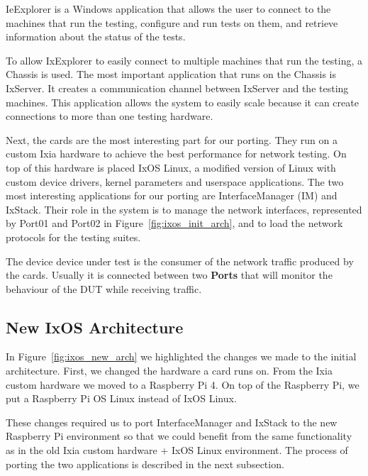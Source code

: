 IeExplorer is a Windows application that allows the user to connect to the
machines that run the testing, configure and run tests on them, and retrieve
information about the status of the tests.

To allow IxExplorer to easily connect to multiple machines that run the testing,
a Chassis is used. The most important application that runs on the Chassis is
IxServer. It creates a communication channel between IxServer and the testing
machines. This application allows the system to easily scale because it can
create connections to more than one testing hardware.

Next, the cards are the most interesting part for our porting. They run on a
custom Ixia hardware to achieve the best performance for network testing. On top
of this hardware is placed IxOS Linux, a modified version of Linux with custom
device drivers, kernel parameters and userspace applications. The two most
interesting applications for our porting are InterfaceManager (IM) and IxStack.
Their role in the system is to manage the network interfaces, represented by
Port01 and Port02 in Figure~\ref{fig:ixos_init_arch}, and to load the network
protocols for the testing suites.

The device device under test is the consumer of the network traffic produced by
the cards. Usually it is connected between two \textbf{Ports} that will monitor the
behaviour of the DUT while receiving traffic.


\subsection{New IxOS Architecture}

\begin{figure*}
    \centering
    \def\svgscale{0.95}
    
    \caption{New IxOS architecture}
    \label{fig:ixos_new_arch}
\end{figure*}

In Figure~\ref{fig:ixos_new_arch} we highlighted the changes we made to the
initial architecture. First, we changed the hardware a card runs on. From the
Ixia custom hardware we moved to a Raspberry Pi 4. On top of the Raspberry Pi,
we put a Raspberry Pi OS Linux instead of IxOS Linux.

These changes required us to port InterfaceManager and IxStack to the new
Raspberry Pi environment so that we could benefit from the same functionality as in the
old Ixia custom hardware + IxOS Linux environment. The process of porting the
two applications is described in the next subsection.

